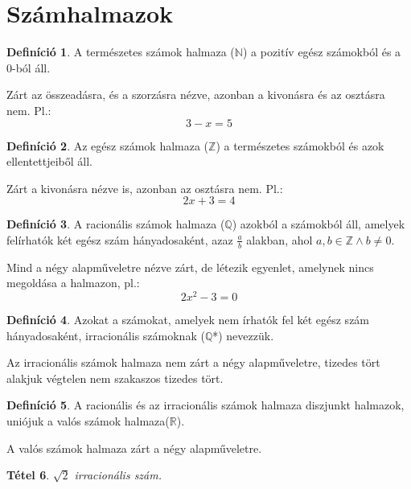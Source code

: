 \documentclass[twoside,12pt]{report}
\newtheorem{theorem}{Tétel}[section]
\theoremstyle{definition}
\newtheorem{definition}[theorem]{Definíció}
\begin{document}
\section{Számhalmazok}
	\begin{definition}
		A természetes számok halmaza ($\mathbb{N}$) a pozitív egész számokból és a 0-ból áll.
		
		Zárt az összeadásra, és a szorzásra nézve, azonban a kivonásra és az osztásra nem. Pl.:
		\begin{equation*}
			3-x=5
		\end{equation*}
	\end{definition}
	\begin{definition}
		Az egész számok halmaza ($\mathbb{Z}$) a természetes számokból és azok ellentettjeiből áll.
		
		Zárt a kivonásra nézve is, azonban az osztásra nem. Pl.:
		\begin{equation*}
			2x+3=4
		\end{equation*}
	\end{definition}
	\begin{definition}
		A racionális számok halmaza ($\mathbb{Q}$) azokból a számokból áll, amelyek felírhatók két egész szám hányadosaként, azaz $\frac{a}{b}$ alakban, ahol $a,b\in\mathbb{Z}\wedge b\ne0$.
		
		Mind a négy alapműveletre nézve zárt, de létezik egyenlet, amelynek nincs megoldása a halmazon, pl.:
		\begin{equation*}
			2x^2-3=0
		\end{equation*}
	\end{definition}
	\begin{definition}
		Azokat a számokat, amelyek nem írhatók fel két egész szám hányadosaként, irracionális
		számoknak ($\mathbb{Q}$*) nevezzük.
		
		Az irracionális számok halmaza nem zárt a négy alapműveletre, tizedes tört alakjuk végtelen nem szakaszos tizedes tört.
	\end{definition}
	\begin{definition}
		A racionális és az irracionális számok halmaza diszjunkt halmazok, uniójuk a valós számok halmaza($\mathbb{R}$).
		
		A valós számok halmaza zárt a négy alapműveletre.
	\end{definition}
	\begin{theorem}
		$\sqrt{2}$ irracionális szám.
	\end{theorem}
\end{document}
